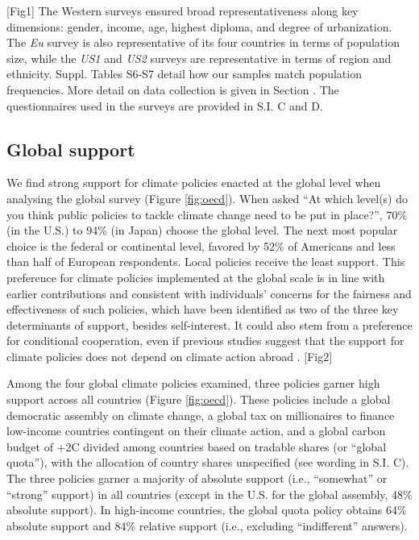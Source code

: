 \documentclass[12pt,english]{article}
\begin{document}
[Fig1] \label{fig:flow_simple}
The Western surveys ensured broad representativeness along key dimensions: gender, income, age, highest diploma, and degree of urbanization. The \textit{Eu} survey is also representative of its four countries in terms of population size, while the \textit{US1} and \textit{US2} surveys are representative in terms of region and ethnicity. 
Suppl. Tables S6-S7 %
detail how our samples match population frequencies. 
More detail on data collection is given in Section . The questionnaires used in the surveys are provided in S.I. C and D. %

\subsection{Global support}\label{subsubsec:global_support}

We find strong support for climate policies enacted at the global level when analysing the global survey (Figure \ref{fig:oecd}). %
When asked ``At which level(s) do you think public policies to tackle climate change need to be put in place?'', 70\% (in the U.S.) to 94\% (in Japan) choose the global level. The next most popular choice is the federal or continental level, favored by 52\% of Americans and less than half of European respondents. Local policies receive the least support. This preference for climate policies implemented at the global scale is in line with earlier contributions \cite{beiser-mcgrath_could_2019,bechtel_mass_2013,sivonen_attitudes_2022} %
and consistent with individuals' concerns for the fairness and effectiveness of such policies, which have been identified as two of the three key determinants of support, besides self-interest.\citep{klenert_making_2018,douenne_yellow_2022,dechezlepretre_fighting_nodate} It could also stem from a preference for conditional cooperation,\citep{barrett_self-enforcing_1994} even if previous studies suggest that the support for climate policies does not depend on climate action abroad \citep{aklin_prisoners_2020,tingley_conditional_2014}. %
[Fig2] \label{fig:oecd}

Among the four global climate policies examined, three policies garner high support across all countries (Figure \ref{fig:oecd}). These policies include a global democratic assembly on climate change, a global tax on millionaires to finance low-income countries contingent on their climate action, and a global carbon budget of +2\textdegree{}C divided among countries based on tradable shares (or ``global quota''), with the allocation of country shares unspecified (see wording in S.I. C). %
The three policies garner a majority of absolute support (i.e., ``somewhat'' or ``strong'' support) in all countries (except in the U.S. for the global assembly, 48\% absolute support). In high-income countries, the global quota policy obtains 64\% absolute support and 84\% relative support (i.e., excluding ``indifferent'' answers). %
\end{document}
